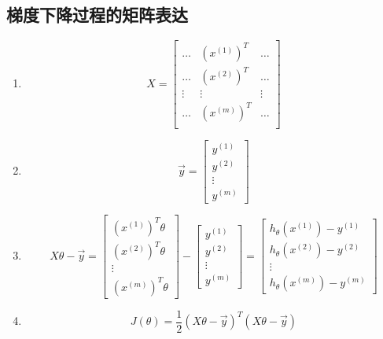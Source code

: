 \subsection{梯度下降过程的矩阵表达}
\begin{enumerate}
	\item 
	\begin{equation}
		X = \left[\begin{matrix}
		\ldots & (x^{(1)})^T & \ldots \\
		\ldots & (x^{(2)})^T & \ldots \\
		\vdots & \vdots & \vdots \\
		\ldots & (x^{(m)})^T & \ldots \\
		\end{matrix}\right]
	\end{equation}

	\item 
	\begin{equation}
		\vec{y} = \left[\begin{matrix}
		y^{(1)} \\ y^{(2)} \\ \vdots \\ y^{(m)}
		\end{matrix}\right]
	\end{equation}

	\item 
	\begin{equation}
		X\theta - \vec{y} = \left[\begin{matrix}
		(x^{(1)})^T\theta \\ (x^{(2)})^T\theta \\ \vdots \\ (x^{(m)})^T\theta
		\end{matrix}\right] - \left[\begin{matrix}
		y^{(1)} \\ y^{(2)} \\ \vdots \\ y^{(m)}
		\end{matrix}\right] = \left[\begin{matrix}
		h_\theta(x^{(1)}) - y^{(1)} \\ h_\theta(x^{(2)}) - y^{(2)} \\ \vdots \\ h_\theta(x^{(m)}) - y^{(m)}
		\end{matrix}\right]
	\end{equation}

	\item 
	\begin{equation}
		J(\theta) = \frac{1}{2}(X\theta - \vec{y})^T(X\theta - \vec{y})
	\end{equation}


\end{enumerate}
